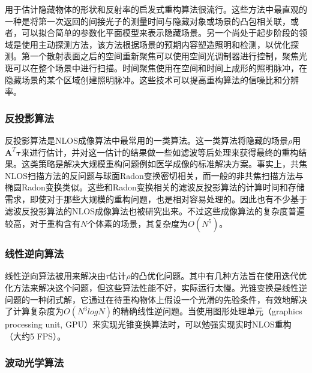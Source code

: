 \documentclass[master]{shtthesis}             %
\begin{document}
用于估计隐藏物体的形状和反射率的启发式重构算法很流行。这些方法中最直观的一种是将第一次返回的间接光子的测量时间与隐藏对象或场景的凸包相关联\citep{Tsai2017}，或者，可以拟合简单的参数化平面模型来表示隐藏场景\citep{Pediredla2017}。另一个尚处于起步阶段的领域是使用主动探测方法，该方法根据场景的预期内容塑造照明和检测，以优化探测。第一个散射表面之后的空间重新聚焦可以使用空间光调制器进行控制，聚焦光斑可以在整个场景中进行扫描\citep{starshynov2019coherent}。时间聚焦使用在空间和时间上成形的照明脉冲，在隐藏场景的某个区域创建照明脉冲\citep{pediredla2019snlos}。这些技术可以提高重构算法的信噪比和分辨率。

\subsubsection{反投影算法}

反投影算法是NLOS成像算法中最常用的一类算法。这一类算法将隐藏的场景$\rho$用$\mathbf{A}^T\mathbf{\tau}$来进行估计，并对这一估计的结果做一些如滤波等后处理来获得最终的重构结果。这类策略是解决大规模重构问题例如医学成像的标准解决方案。事实上，共焦NLOS扫描方法的反问题与球面Radon变换密切相关\citep{tasinkevych2014circular}，而一般的非共焦扫描方法与椭圆Radon变换类似\citep{moon2014determination}。这些和Radon变换相关的滤波反投影算法的计算时间和存储需求，即使对于那些大规模的重构问题，也是相对容易处理的。因此也有不少基于滤波反投影算法的NLOS成像算法也被研究出来\citep{Velten2012,gupta2012reconstruction,buttafava2014time,Laurenzis2014,Arellano2017}。不过这些成像算法的复杂度普遍较高，对于重构含有$N$个体素的场景，其复杂度为$O(N^5)$。

\subsubsection{线性逆向算法}

线性逆向算法被用来解决由$\tau$估计$\rho$的凸优化问题。其中有几种方法旨在使用迭代优化方法来解决这个问题\citep{gupta2012reconstruction,wu2012frequency,heide2014diffuse}，但这些算法性能不好，实际运行太慢。光锥变换\citep{Otoole2018}是线性逆问题的一种闭式解，它通过在待重构物体上假设一个光滑的先验条件，有效地解决了计算复杂度为$O(N^3logN)$的精确线性逆问题。当使用图形处理单元（graphics processing unit, GPU）来实现光锥变换算法时，可以勉强实现实时NLOS重构（大约5 FPS）\citep{DBLP:journals/corr/abs-2010-12737}。

\subsubsection{波动光学算法}
\end{document}
